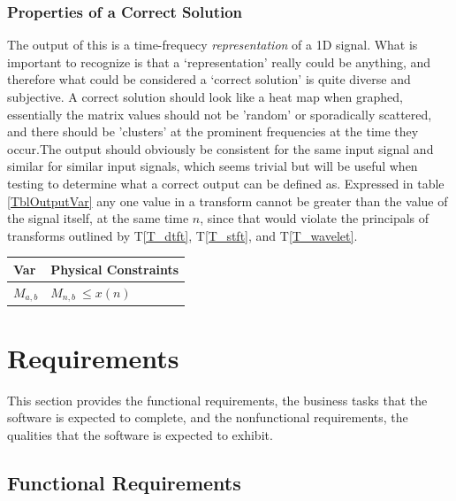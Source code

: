 \documentclass[12pt]{article}
\begin{document}
\subsubsection{Properties of a Correct Solution} \label{sec_CorrectSolution}

\noindent
The output of this \progname{} is a time-frequecy \emph{representation} of a 1D signal. What is important to recognize is that a `representation' really could be anything, and therefore what could be considered a `correct solution' is quite diverse and subjective. A correct solution should look like a heat map when graphed, essentially the matrix values should not be 'random' or sporadically scattered, and there should be 'clusters' at the prominent frequencies at the time they occur.The output should obviously be consistent for the same input signal and similar for similar input signals, which seems trivial but will be useful when testing to determine what a correct output can be defined as. Expressed in table \ref{TblOutputVar} any one value in a transform cannot be greater than the value of the signal itself, at the same time $n$, since that would violate the principals of transforms outlined by T\ref{T_dtft}, T\ref{T_stft}, and T\ref{T_wavelet}.

\begin{table}[!h]
\caption{Output Variables} \label{TblOutputVar}
\renewcommand{\arraystretch}{1.2}
\noindent \begin{longtable*}{l l} 
  \toprule
  \textbf{Var} & \textbf{Physical Constraints} \\
  \midrule 
  $M_{a,b}$ & $ M_{n,b}\ \leq x(n) $
  \\
  \bottomrule
\end{longtable*}
\end{table}

\section{Requirements}

This section provides the functional requirements, the business tasks that the
software is expected to complete, and the nonfunctional requirements, the
qualities that the software is expected to exhibit.

\subsection{Functional Requirements}
\end{document}
